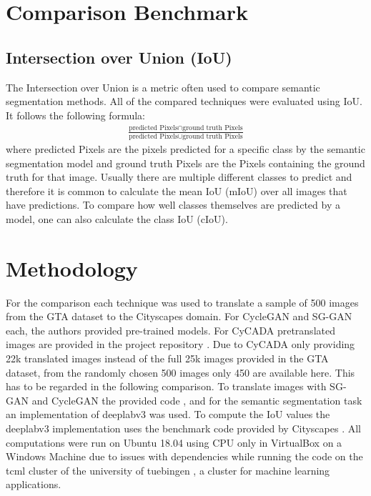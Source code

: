 \section{Comparison Benchmark}
\subsection{Intersection over Union (IoU)}
The Intersection over Union is a metric often used to compare semantic segmentation methods. All of the compared techniques were evaluated using IoU. It follows the following formula:
\begin{align*}
	\frac{\text{predicted Pixels} \cap \text{ground truth Pixels}}{\text{predicted Pixels} \cup \text{ground truth Pixels}}
\end{align*}
where predicted Pixels are the pixels predicted for a specific class by the semantic segmentation model and ground truth Pixels are the Pixels containing the ground truth for that image. Usually there are multiple different classes to predict and therefore it is common to calculate the mean IoU (mIoU) over all images that have predictions. To compare how well classes themselves are predicted by a model, one can also calculate the class IoU (cIoU).

\section{Methodology}
For the comparison each technique was used to translate a sample of 500 images from the GTA dataset to the Cityscapes domain. For CycleGAN and SG-GAN each, the authors provided pre-trained models. For CyCADA pretranslated images are provided in the project repository \cite{CyCADA}. Due to CyCADA only providing 22k translated images instead of the full 25k images provided in the GTA dataset, from the randomly chosen 500 images only 450 are available here. This has to be regarded in the following comparison. To translate images with SG-GAN and CycleGAN the provided code \cite{SG},\cite{Cycle} and for the semantic segmentation task an implementation \cite{DLR} of deeplabv3 \cite{DBLP:journals/corr/ChenPSA17} was used. To compute the IoU values the deeplabv3 implementation uses the benchmark code provided by Cityscapes \cite{CSR}. All computations were run on Ubuntu 18.04 using CPU only in VirtualBox on a Windows Machine due to issues with dependencies while running the code on the tcml cluster of the university of tuebingen \cite{tcml}, a cluster for machine learning applications.

